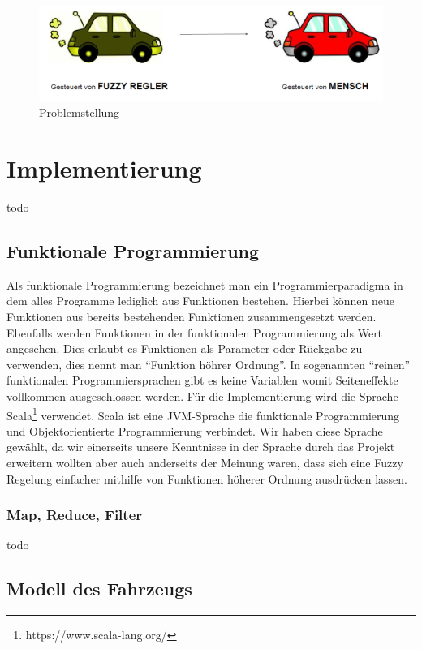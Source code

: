 \documentclass[12pt,a4paper,bibliography=totocnumbered,listof=totocnumbered, abstracton]{scrartcl}
\theoremstyle{Umgebung}
\begin{document}
\begin{figure}
	\centering
	\includegraphics[width=0.9\linewidth]{img/practical/problem}
	\caption{Problemstellung}
	\label{fig:problem}
\end{figure}

\section{Implementierung}

todo

\subsection{Funktionale Programmierung}

Als funktionale Programmierung bezeichnet man ein Programmierparadigma in dem alles Programme lediglich aus Funktionen bestehen. Hierbei können neue Funktionen aus bereits bestehenden Funktionen zusammengesetzt werden. Ebenfalls werden Funktionen in der funktionalen Programmierung als Wert angesehen. Dies erlaubt es Funktionen als Parameter oder Rückgabe zu verwenden, dies nennt man \enquote{Funktion höhrer Ordnung}. In sogenannten \enquote{reinen} funktionalen Programmiersprachen gibt es keine Variablen womit Seiteneffekte vollkommen ausgeschlossen werden. Für die Implementierung wird die Sprache Scala\footnote{https://www.scala-lang.org/} verwendet. Scala ist eine JVM-Sprache die funktionale Programmierung und Objektorientierte Programmierung verbindet. Wir haben diese Sprache gewählt, da wir einerseits unsere Kenntnisse in der Sprache durch das Projekt erweitern wollten aber auch anderseits der Meinung waren, dass sich eine Fuzzy Regelung einfacher mithilfe von Funktionen höherer Ordnung ausdrücken lassen.

\subsubsection{Map, Reduce, Filter}

todo

\subsection{Modell des Fahrzeugs}
\end{document}
